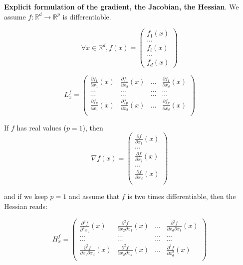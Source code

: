 \documentclass[
10pt, %
a4paper, %
oneside, %
headinclude,footinclude, %
BCOR5mm, %
]{scrartcl}
\begin{document}
\textbf{{Explicit formulation of the gradient, the Jacobian, the Hessian}}. We assume $f: \mathbb{R}^d\rightarrow  \mathbb{R}^p $ is differentiable.

\begin{equation*}
    \forall x\in \mathbb{R}^d, f(x)=
\begin{pmatrix}
    f_1(x)\\
...\\
    f_{i}(x)\\
...\\
    f_{d}(x)
\end{pmatrix}
\end{equation*}

\begin{equation*}
L^f_x=
\begin{pmatrix}
    \frac{\partial f_1}{\partial x_1}(x)  & \frac{\partial f_1}{\partial x_2}(x) & \dots & \frac{\partial f_1}{\partial x_d}(x) \\
\dots & \dots & \dots & \dots \\
\dots & \dots & \dots & \dots \\
    \frac{\partial f_p}{\partial x_1}(x)  & \frac{\partial f_p}{\partial x_2}(x) & \dots & \frac{\partial f_p}{\partial x_d}(x) \\
\end{pmatrix}
\end{equation*}

If $f$ has real values ($p=1$), then
\begin{equation}
    \nabla f(x)=
    \begin{pmatrix}
	\frac{\partial f}{\partial x_1} (x)\\
...\\
	\frac{\partial f}{\partial x_i}(x) \\
...\\
	\frac{\partial f}{\partial x_d} (x)\\
\end{pmatrix}
\end{equation}

and if we keep $p=1$ and assume that $f$ is two times differentiable, then the Hessian reads:

\begin{equation*}
H^f_x=
\begin{pmatrix}
    \frac{\partial^2 f}{\partial^2 x_1}(x)  & \frac{\partial^2 f}{\partial x_2\partial x_1}(x) & \dots & \frac{\partial^2 f}{\partial x_d\partial x_1}(x) \\
\dots & \dots & \dots & \dots \\
\dots & \dots & \dots & \dots \\
    \frac{\partial^2 f}{\partial x_1\partial x_d}(x)  & \frac{\partial^2 f}{\partial x_2\partial x_d}(x) & \dots & \frac{\partial^2 f}{\partial x_d^2}(x) \\
\end{pmatrix}
\end{equation*}
\end{document}
